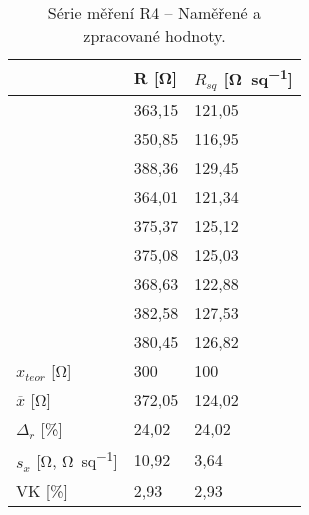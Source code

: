 \begin{table}[h!]
    \caption{Série měření R4 -- Naměřené a zpracované hodnoty.}
    \centering
    \def\arraystretch{1.4}
    \begin{tabular}{l|l|l}
                                                      & R [\unit{\ohm}]    & \(R_{sq}\) [\unit{\ohm\per sq}]  \\ \hline\hline
                                                      & 363,15 & 121,05 \\ \hline
                                                      & 350,85 & 116,95 \\ \hline
                                                      & 388,36 & 129,45 \\ \hline
                                                      & 364,01 & 121,34 \\ \hline
                                                      & 375,37 & 125,12 \\ \hline
                                                      & 375,08 & 125,03 \\ \hline
                                                      & 368,63 & 122,88 \\ \hline
                                                      & 382,58 & 127,53 \\ \hline
                                                      & 380,45 & 126,82 \\ \hline\hline
        \(x_{teor} \) [\unit{\ohm}]                   & 300    & 100    \\ \hline
        \(\overline{x} \) [\unit{\ohm}]               & 372,05 & 124,02 \\ \hline
        \(\Delta_{r} \) [\unit{\percent}]             & 24,02& 24,02\\ \hline\hline
        \(s_{x} \) [\unit{\ohm}, \unit{\ohm\per sq}]  & 10,92   & 3,64   \\ \hline
        VK [\unit{\percent}]                          & 2,93 & 2,93 \\ 
    \end{tabular}
    \label{tab:r4_hodnoty}
\end{table}

